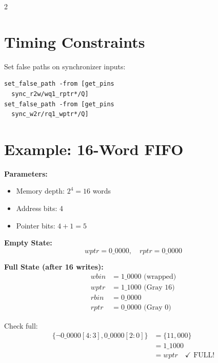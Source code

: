 \documentclass[10pt,landscape]{article}
\begin{document}
\begin{multicols}{2}
\section*{Timing Constraints}

\begin{tcolorbox}[colback=gray!10,colframe=black,title=CDC False Paths]
Set false paths on synchronizer inputs:

\begin{verbatim}
set_false_path -from [get_pins
  sync_r2w/wq1_rptr*/Q]
set_false_path -from [get_pins
  sync_w2r/rq1_wptr*/Q]
\end{verbatim}
\end{tcolorbox}

\section*{Example: 16-Word FIFO}

\textbf{Parameters:}
\begin{itemize}
    \item Memory depth: $2^4 = 16$ words
    \item Address bits: 4
    \item Pointer bits: $4 + 1 = 5$
\end{itemize}

\textbf{Empty State:}
\begin{equation*}
wptr = 0\_0000, \quad rptr = 0\_0000
\end{equation*}

\textbf{Full State (after 16 writes):}
\begin{align*}
wbin &= 1\_0000 \text{ (wrapped)} \\
wptr &= 1\_1000 \text{ (Gray 16)} \\
rbin &= 0\_0000 \\
rptr &= 0\_0000 \text{ (Gray 0)}
\end{align*}

Check full:
\begin{align*}
\{\neg 0\_0000[4:3], 0\_0000[2:0]\} &= \{11, 000\} \\
&= 1\_1000 \\
&= wptr \quad \checkmark \text{ FULL!}
\end{align*}


\end{multicols}
\end{document}
